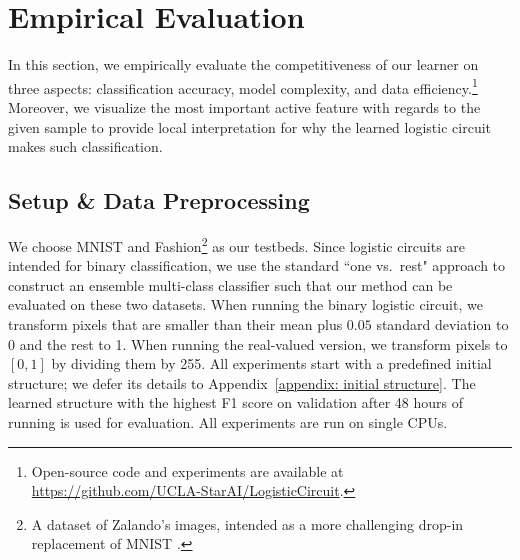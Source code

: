 \documentclass[letterpaper]{article} %
\begin{document}
\section{Empirical Evaluation} \label{s:experiments}

In this section, we empirically evaluate the competitiveness of our learner on three aspects: classification accuracy, model complexity,  and data efficiency.\footnote{Open-source code and experiments are available at
\url{https://github.com/UCLA-StarAI/LogisticCircuit}.}
Moreover, we visualize the most important active feature with regards to the given sample to provide local interpretation for why the learned logistic circuit makes such classification.
\subsection{Setup \& Data Preprocessing}
We choose MNIST and Fashion\footnote{A dataset of Zalando's images,  intended as a more challenging drop-in replacement of MNIST \cite{fashion2017}.} as our testbeds.
Since logistic circuits are intended for binary classification, we use the standard ``one vs.~rest" approach to construct an ensemble multi-class classifier such that our method can be evaluated on these two datasets. When running the binary logistic circuit, we transform pixels that are smaller than their mean plus $0.05$ standard deviation to 0 and the rest to 1. When running the real-valued version, we transform pixels to $[0,1]$ by dividing them by 255. All experiments start with a predefined initial structure; we defer its details to Appendix~\ref{appendix: initial structure}.
The learned structure with the highest F1 score on validation after 48 hours of running is used for evaluation. All experiments are run on single CPUs.
\end{document}
